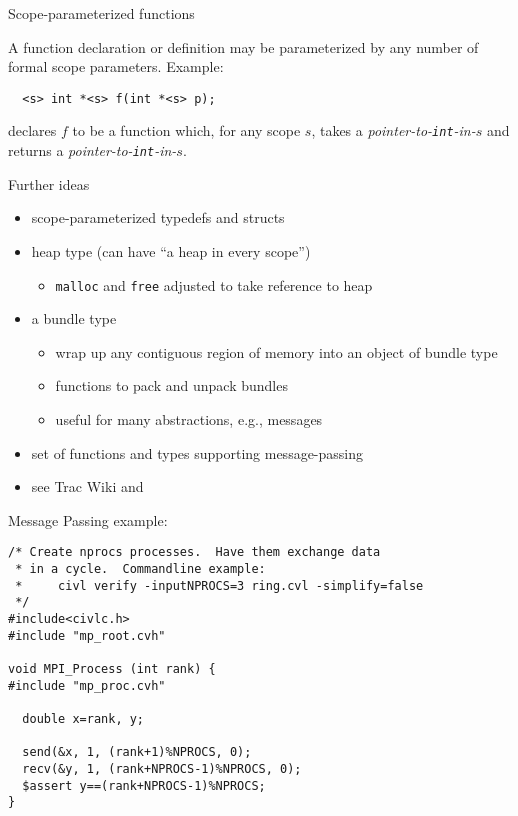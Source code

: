 \documentclass[t]{beamer}
\begin{document}
\begin{frame}[containsverbatim]{Scope-parameterized functions}

  A function declaration or definition may be parameterized by any number
  of \alert{formal scope parameters}.   Example:

  \begin{mycbox}{7cm}
\begin{verbatim}
  <s> int *<s> f(int *<s> p);
\end{verbatim}
  \end{mycbox}

  declares $f$ to be a function which, for any scope $s$, takes a
  \emph{pointer-to-\texttt{int}-in-$s$} and returns a
  \emph{pointer-to-\texttt{int}-in-$s$}.

\end{frame}

\begin{frame}{Further ideas}
  \begin{itemize}
  \item scope-parameterized \alert{typedefs} and \alert{structs}
  \item \alert{heap} type (can have ``a heap in every scope'')
    \begin{itemize}
    \item \texttt{malloc} and \texttt{free} adjusted to take reference to heap
    \end{itemize}
  \item a \alert{bundle type}
    \begin{itemize}
    \item wrap up any contiguous region of memory into an object of bundle type
    \item functions to \alert{pack} and \alert{unpack} bundles
    \item useful for many abstractions, e.g., messages
    \end{itemize}
  \item set of functions and types supporting \alert{message-passing}
  \item see Trac Wiki and 
  \end{itemize}
\end{frame}

\begin{frame}[containsverbatim]{Message Passing example: }

\begin{verbatim}
/* Create nprocs processes.  Have them exchange data
 * in a cycle.  Commandline example:
 *     civl verify -inputNPROCS=3 ring.cvl -simplify=false
 */
#include<civlc.h>
#include "mp_root.cvh"

void MPI_Process (int rank) {
#include "mp_proc.cvh"

  double x=rank, y;

  send(&x, 1, (rank+1)%NPROCS, 0);
  recv(&y, 1, (rank+NPROCS-1)%NPROCS, 0);
  $assert y==(rank+NPROCS-1)%NPROCS;
}
\end{verbatim}
\end{frame}
\end{document}
